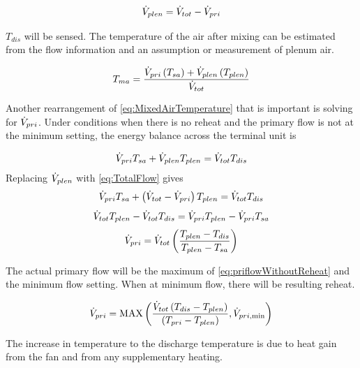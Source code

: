 \begin{equation} \label{eq:TotalFlow}
    \dot{V}_{plen} = \dot{V}_{tot} - \dot{V}_{pri}
\end{equation}

\(T_{dis}\) will be sensed. The temperature of the air after mixing can be
estimated from the flow information and an assumption or measurement of plenum
air.

\begin{equation} \label{eq:MixedAirTemperature}
T_{ma} = \frac{{{\dot{V}_{pri}}\left( {T_{sa}} \right) + \dot{V}_{plen} \left( {{T_{plen}}} \right)}}{\dot{V}_{tot}}
\end{equation}

Another rearrangement of \ref{eq:MixedAirTemperature} that is important is
solving for \(\dot{V}_{pri}\). Under conditions when there is no reheat and the
primary flow is not at the minimum setting, the energy balance across the
terminal unit is

\begin{equation}
    \dot{V}_{pri} T_{sa} + \dot{V}_{plen} T_{plen} = \dot{V}_{tot} T_{dis}
\end{equation}
Replacing \(\dot{V}_{plen}{} \) with  \ref{eq:TotalFlow} gives
\begin{equation}
    \dot{V}_{pri} T_{sa} +  \left(\dot{V}_{tot} - \dot{V}_{pri} \right)  T_{plen} = \dot{V}_{tot} T_{dis}
\end{equation}
\begin{equation}
 \dot{V}_{tot} T_{plen}  -   \dot{V}_{tot} T_{dis}  = \dot{V}_{pri}  T_{plen}  - \dot{V}_{pri} T_{sa}
\end{equation}
\begin{equation}\label{eq:priflowWithoutReheat}
   \dot{V}_{pri} = \dot{V}_{tot} \left( \frac{T_{plen} - T_{dis} }{T_{plen} - T_{sa}} \right)
\end{equation}

The actual primary flow will be the maximum of 
\ref{eq:priflowWithoutReheat} and the minimum flow setting. When at minimum
flow, there will be resulting reheat.


\begin{equation} \label{eq:PrimaryFlowInTerminalUnit}
    \dot{V}_{pri} = \text{MAX}\left(\frac{\dot{V}_{tot} \left(T_{dis} - T_{plen} \right)}{\left(T_{pri} - T_{plen} \right)}, \dot{V}_{pri, \text{min}} \right)
\end{equation}


The increase in temperature to the discharge temperature is due to heat gain
from the fan and from any supplementary heating.

